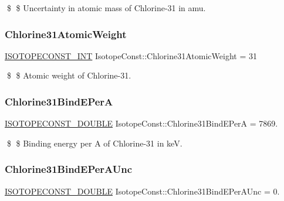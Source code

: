 \$ \$ Uncertainty in atomic mass of Chlorine-\/31 in amu. \mbox{\label{group___isotope_const-_chlorine-_cl31_ga0b530e8cab21b90c4084438392dbf0c5}} 
\subsubsection{\texorpdfstring{Chlorine31\+Atomic\+Weight}{Chlorine31AtomicWeight}}
{\footnotesize\ttfamily \mbox{\hyperlink{group___isotope_const-_macros_ga5f18360b3e99483a35c32d789e62621c}{I\+S\+O\+T\+O\+P\+E\+C\+O\+N\+S\+T\+\_\+\+I\+NT}} Isotope\+Const\+::\+Chlorine31\+Atomic\+Weight = 31}

\$ \$ Atomic weight of Chlorine-\/31. \mbox{\label{group___isotope_const-_chlorine-_cl31_ga7b164c581784cdbaf2de9731c08a3008}} 
\subsubsection{\texorpdfstring{Chlorine31\+Bind\+E\+PerA}{Chlorine31BindEPerA}}
{\footnotesize\ttfamily \mbox{\hyperlink{group___isotope_const-_macros_ga8f45a7272ce02c0b4c65c44636ed719a}{I\+S\+O\+T\+O\+P\+E\+C\+O\+N\+S\+T\+\_\+\+D\+O\+U\+B\+LE}} Isotope\+Const\+::\+Chlorine31\+Bind\+E\+PerA = 7869.}

\$ \$ Binding energy per A of Chlorine-\/31 in keV. \mbox{\label{group___isotope_const-_chlorine-_cl31_ga0b00777c23e635a2aa26bc60db138f0a}} 
\subsubsection{\texorpdfstring{Chlorine31\+Bind\+E\+Per\+A\+Unc}{Chlorine31BindEPerAUnc}}
{\footnotesize\ttfamily \mbox{\hyperlink{group___isotope_const-_macros_ga8f45a7272ce02c0b4c65c44636ed719a}{I\+S\+O\+T\+O\+P\+E\+C\+O\+N\+S\+T\+\_\+\+D\+O\+U\+B\+LE}} Isotope\+Const\+::\+Chlorine31\+Bind\+E\+Per\+A\+Unc = 0.}

